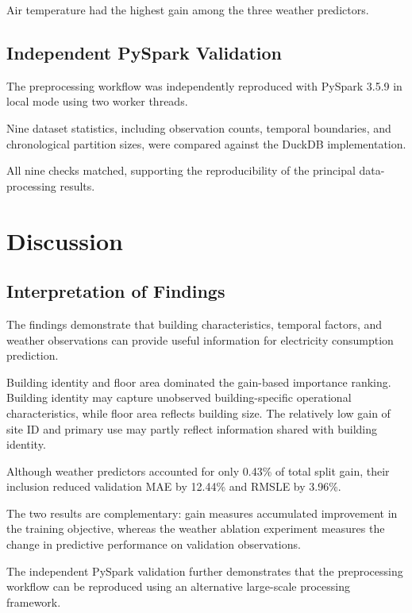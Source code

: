 \documentclass[12pt]{article}
\begin{document}
Air temperature had the highest gain among the three
weather predictors.

\subsection{Independent PySpark Validation}

The preprocessing workflow was independently reproduced with PySpark 3.5.9 in local mode using two worker threads.

Nine dataset statistics, including observation counts, temporal boundaries, and chronological partition sizes, were compared against the DuckDB implementation.

All nine checks matched, supporting the reproducibility of the principal data-processing results.



\section{Discussion}

\subsection{Interpretation of Findings}

The findings demonstrate that building characteristics, temporal factors, and weather observations can provide useful information for electricity consumption prediction.

Building identity and floor area dominated the gain-based importance ranking. Building identity may capture unobserved building-specific operational characteristics, while floor area reflects building size. The relatively low gain of site ID and primary use may partly reflect information shared with building identity.

Although weather predictors accounted for only 0.43\% of total split gain, their inclusion reduced validation MAE by 12.44\% and RMSLE by 3.96\%.

The two results are complementary: gain measures accumulated improvement in the training objective, whereas the weather ablation experiment measures the change in predictive performance on validation observations.

The independent PySpark validation further demonstrates that the preprocessing workflow can be reproduced using an alternative large-scale processing framework.
\end{document}
